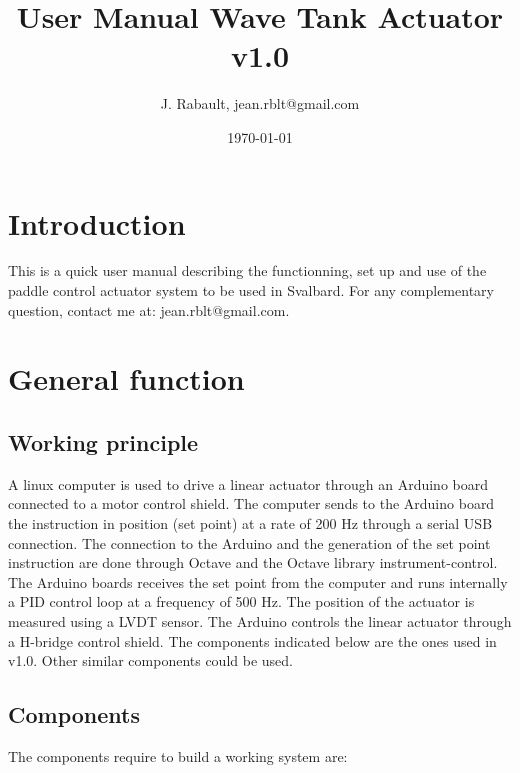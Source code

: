 \documentclass[pdftex,a4paper,12pt,onecolumn,fleqn,captions=tableheading]{scrartcl}
\begin{document}
\title{User Manual Wave Tank Actuator v1.0}
\author{J. Rabault, jean.rblt@gmail.com}
\date{\today}

\maketitle

\section{Introduction}

This is a quick user manual describing the functionning, set up and use of the paddle control actuator system to be used in Svalbard. For any complementary question, contact me at: jean.rblt@gmail.com.

\section{General function}

\subsection{Working principle}

A linux computer is used to drive a linear actuator through an Arduino board connected to a motor control shield. The computer sends to the Arduino board the instruction in position (set point) at a rate of 200 Hz through a serial USB connection. The connection to the Arduino and the generation of the set point instruction are done through Octave and the Octave library instrument-control. The Arduino boards receives the set point from the computer and runs internally a PID control loop at a frequency of 500 Hz. The position of the actuator is measured using a LVDT sensor. The Arduino controls the linear actuator through a H-bridge control shield. The components indicated below are the ones used in v1.0. Other similar components could be used.

\subsection{Components}

The components require to build a working system are:
\end{document}
